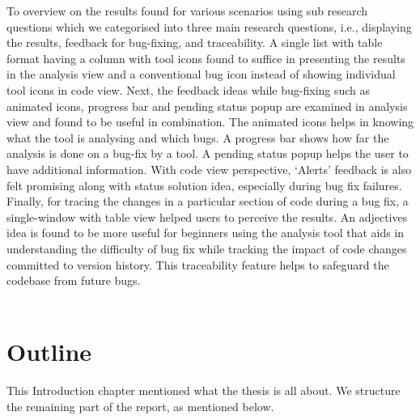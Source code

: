To overview on the results found for various scenarios using sub research questions which we categorised into three main research questions, i.e., displaying the results, feedback for bug-fixing, and traceability. A single list with table format having a column with tool icons found to suffice in presenting the results in the analysis view and a conventional bug icon instead of showing individual tool icons in code view. Next, the feedback ideas while bug-fixing such as animated icons, progress bar and pending status popup are examined in analysis view and found to be useful in combination. The animated icons helps in knowing what the tool is analysing and which bugs. A progress bar shows how far the analysis is done on a bug-fix by a tool. A pending status popup helps the user to have additional information. With code view perspective, ‘Alerts’ feedback is also felt promising along with status solution idea, especially during bug fix failures. Finally, for tracing the changes in a particular section of code during a bug fix, a single-window with table view helped users to perceive the results. An adjectives idea is found to be more useful for beginners using the analysis tool that aids in understanding the difficulty of bug fix while tracking the impact of code changes committed to version history. This traceability feature helps to safeguard the codebase from future bugs. \\ \\

\section{Outline}

This Introduction chapter mentioned what the thesis is all about. We structure the remaining part of the report, as mentioned below. \\ \\


